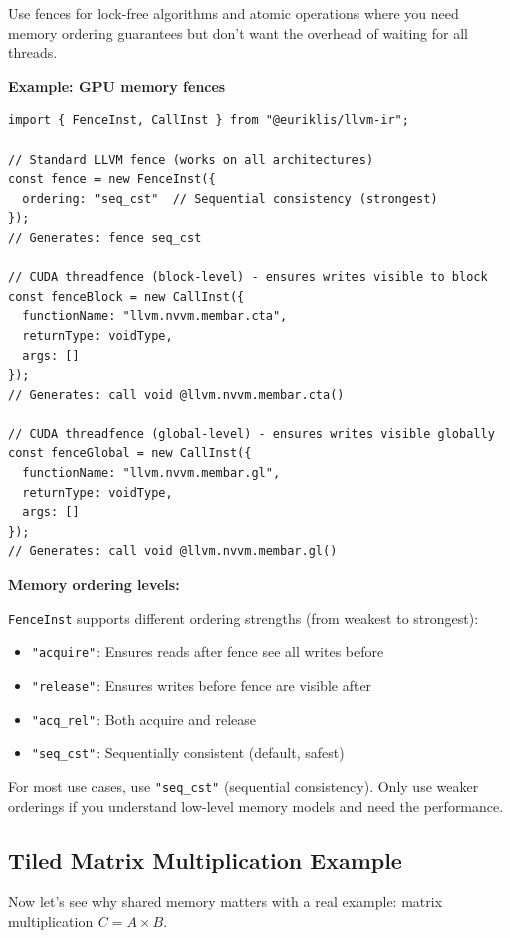 \documentclass[11pt]{article}
\begin{document}
Use fences for lock-free algorithms and atomic operations where you need memory ordering guarantees but don't want the overhead of waiting for all threads.

\textbf{Example: GPU memory fences}

\begin{lstlisting}[style=ts]
import { FenceInst, CallInst } from "@euriklis/llvm-ir";

// Standard LLVM fence (works on all architectures)
const fence = new FenceInst({
  ordering: "seq_cst"  // Sequential consistency (strongest)
});
// Generates: fence seq_cst

// CUDA threadfence (block-level) - ensures writes visible to block
const fenceBlock = new CallInst({
  functionName: "llvm.nvvm.membar.cta",
  returnType: voidType,
  args: []
});
// Generates: call void @llvm.nvvm.membar.cta()

// CUDA threadfence (global-level) - ensures writes visible globally
const fenceGlobal = new CallInst({
  functionName: "llvm.nvvm.membar.gl",
  returnType: voidType,
  args: []
});
// Generates: call void @llvm.nvvm.membar.gl()
\end{lstlisting}

\textbf{Memory ordering levels:}

\texttt{FenceInst} supports different ordering strengths (from weakest to strongest):
\begin{itemize}[noitemsep]
  \item \texttt{"acquire"}: Ensures reads after fence see all writes before
  \item \texttt{"release"}: Ensures writes before fence are visible after
  \item \texttt{"acq\_rel"}: Both acquire and release
  \item \texttt{"seq\_cst"}: Sequentially consistent (default, safest)
\end{itemize}

For most use cases, use \texttt{"seq\_cst"} (sequential consistency). Only use weaker orderings if you understand low-level memory models and need the performance.

\subsection{Tiled Matrix Multiplication Example}

Now let's see why shared memory matters with a real example: matrix multiplication \(C = A \times B\).
\end{document}
